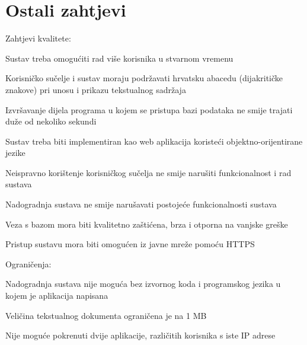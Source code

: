 		\section{Ostali zahtjevi}
		
			Zahtjevi kvalitete:
			 \begin{packed_item}
			 	\item Sustav treba omogućiti rad više korisnika u stvarnom vremenu
			 	\item Korisničko sučelje i sustav moraju podržavati hrvatsku abacedu (dijakritičke znakove) pri unosu i prikazu tekstualnog sadržaja
			 	\item Izvršavanje dijela programa u kojem se pristupa bazi podataka ne smije trajati duže od nekoliko sekundi
			 	\item Sustav treba biti implementiran kao web aplikacija koristeći objektno-orijentirane jezike
			 	\item Neispravno korištenje korisničkog sučelja ne smije narušiti funkcionalnost i rad sustava
			 	\item Nadogradnja sustava ne smije narušavati postojeće funkcionalnosti sustava
			 	\item Veza s bazom mora biti kvalitetno zaštićena, brza i otporna na vanjske greške
			 	\item Pristup sustavu mora biti omogućen iz javne mreže pomoću HTTPS
			 	
			 \end{packed_item}
	\text{\newline}	 
	 Ograničenja:
		 \begin{packed_item}
			 \item Nadogradnja sustava nije moguća bez izvornog koda i programskog jezika u kojem je aplikacija napisana
			 \item Veličina tekstualnog dokumenta ograničena je na 1 MB
			 \item Nije moguće pokrenuti dvije aplikacije, različitih korisnika s iste IP adrese
		\end{packed_item}
			 
	